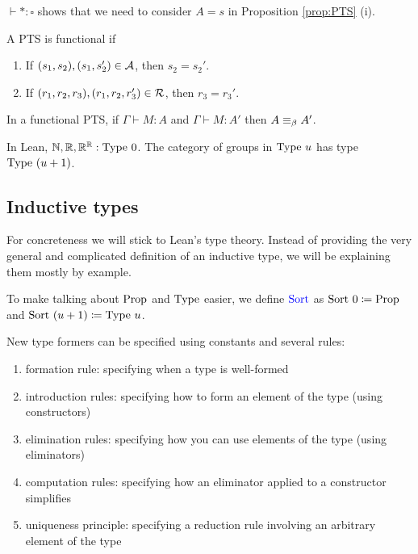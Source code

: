 \begin{rem}
    $\vdash * : \square$ shows that we need to consider $A = s$ in Proposition \ref{prop:PTS} (i).
\end{rem}

\begin{boxdefi}
    A PTS is \alert{functional} if
    \begin{enumerate}
        \item If $(s_1, s_2), (s_1, s_2') \in \mathcal{A}$, then $s_2 =s_2'$.
        \item If $(r_1, r_2, r_3), (r_1, r_2, r_3') \in \mathcal{R}$, then $r_3 = r_3'$.
    \end{enumerate}
\end{boxdefi}

\begin{boxthm}
    In a functional PTS, if $\Gamma \vdash M : A$ and $\Gamma \vdash M : A'$ then $A \equiv_{\beta} A'$.
\end{boxthm}

\begin{rem}
    In Lean, $\mathbb{N}, \mathbb{R}, \mathbb{R}^{\mathbb{R}} : \mathrm{Type}\ 0$.
    The category of groups in $\mathrm{Type}\ u$ has type $\mathrm{Type}\ (u + 1)$.
\end{rem}

\subsection{Inductive types}

For concreteness we will stick to Lean's type theory.
Instead of providing the very general and complicated definition of an inductive type, we will be explaining them mostly by example.

\begin{rem}
    To make talking about $\mathrm{Prop}$ and $\mathrm{Type}$ easier, we define $\alert{\sort}$ as $\mathrm{Sort}\ 0 \coloneq \mathrm{Prop}$ and $\mathrm{Sort}\ (u + 1) \coloneq \mathrm{Type}\ u$.
\end{rem}

\begin{boxdefi}
    New type formers can be specified using constants and several rules:
    \begin{enumerate}
        \item \alert{formation rule}: specifying when a type is well-formed
        \item \alert{introduction rules}: specifying how to form an element of the type (using constructors)
        \item \alert{elimination rules}: specifying how you can use elements of the type (using eliminators)
        \item \alert{computation rules}: specifying how an eliminator applied to a constructor simplifies
        \item \alert{uniqueness principle}: specifying a reduction rule involving an arbitrary element of the type
    \end{enumerate}
\end{boxdefi}

